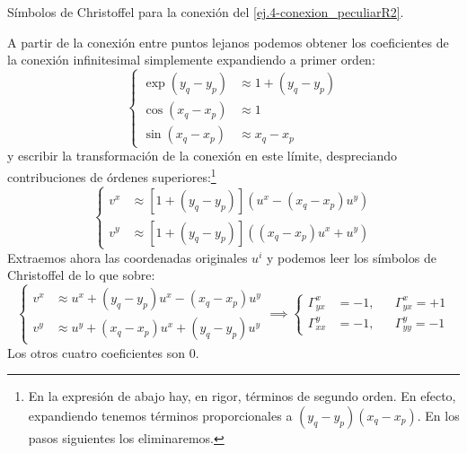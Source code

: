 \begin{example}
    {Símbolos de Christoffel para la conexión del \cref{ej.4-conexion_peculiarR2}.
    \label{ej.4-christoffel_from_connection}}

    A partir de la conexión entre puntos lejanos podemos obtener los coeficientes de la conexión infinitesimal simplemente expandiendo a primer orden:
    \begin{equation*}
        \left\{
        \begin{aligned}
            \exp(y_q-y_p) &\approx 1 + (y_q - y_p)\\
            \cos(x_q-x_p) &\approx 1\\
            \sin(x_q-x_p) &\approx x_q-x_p
        \end{aligned}\right.
    \end{equation*}
    y escribir la transformación de la conexión en este límite, despreciando contribuciones de órdenes superiores:\footnote{En la expresión de abajo hay, en rigor, términos de segundo orden. En efecto, expandiendo tenemos términos proporcionales a \((y_q - y_p)(x_q - x_p)\). En los pasos siguientes los eliminaremos.}
    \begin{equation*}
        \left\{
        \begin{aligned}
            v^x &\approx \left[1 + (y_q - y_p)\right]\left(u^x - (x_q-x_p)u^y\right)\\
            v^y &\approx \left[1 + (y_q - y_p)\right]\left((x_q-x_p)u^x + u^y\right)
        \end{aligned}\right.
    \end{equation*}
    Extraemos ahora las coordenadas originales \(u^i\) y podemos leer los símbolos de Christoffel de lo que sobre:
    \begin{equation*}
        \left\{
        \begin{aligned}
            v^x &\approx u^x + (y_q - y_p)u^x - (x_q - x_p)u^y\\
            v^y &\approx u^y + (x_q - x_p)u^x + (y_q - y_p)u^y
        \end{aligned}\right. \implies 
        \left\{
        \begin{aligned}
            \Gamma^x_{yx} &= -1, && \Gamma^{x}_{yx}  = +1\\
            \Gamma^y_{xx} &= -1, && \Gamma^{y}_{yy}  = -1
        \end{aligned}\right.
    \end{equation*}
    Los otros cuatro coeficientes son 0.
\end{example}


